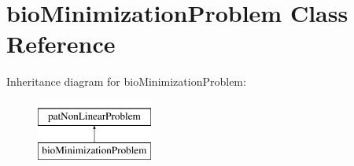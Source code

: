 \hypertarget{classbio_minimization_problem}{}\section{bio\+Minimization\+Problem Class Reference}
\label{classbio_minimization_problem}
Inheritance diagram for bio\+Minimization\+Problem\+:\begin{figure}[H]
\begin{center}
\leavevmode
\includegraphics[height=2.000000cm]{classbio_minimization_problem}
\end{center}
\end{figure}
